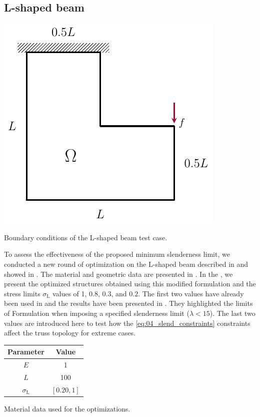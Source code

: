 \subsection{L-shaped beam}
\begin{marginfigure}
    \centering
    \includegraphics[width=\linewidth]{figures/04_TTO_improvements/06_L_bc/L_bc.pdf}
    \caption{Boundary conditions of the L-shaped beam test case.}
    \label{fig:04_LBC}
\end{marginfigure}
To assess the effectiveness of the proposed minimum slenderness limit, we conducted a new round of optimization on the L-shaped beam described in  and showed in . The material and geometric data are presented in . In the , we present the optimized structures obtained using this modified formulation and the stress limits $\sigma_\text{L}$ values of 1, $0.8$, $0.3$, and $0.2$. The first two values have already been used in  and the results have been presented in . They highlighted the limits of Formulation  when imposing a specified slenderness limit ($\lambda<15$). The last two values are introduced here to test how the \ref{eq:04_slend_constraints} constraints affect the truss topology for extreme cases. 
\begin{margintable}
    \small
    \centering
    \begin{tabular}{cc}
    \toprule
    \textbf{Parameter}        & \textbf{Value} \\ \midrule
    $E$              & 1     \\
    $L$              & 100   \\
    $\sigma_\text{L}$ & $[0.20,1]$ \\
    \bottomrule
    \end{tabular}
    \caption{Material data used for the optimizations.}
    \label{tab:04_mat_l}
\end{margintable}

